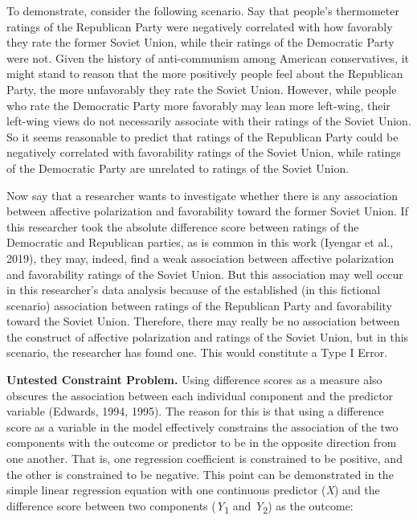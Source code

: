 \documentclass[authordate, meta, issue]{jote-new-article}
\begin{document}
	To demonstrate, consider the following scenario. Say that people's thermometer ratings of the Republican Party were negatively correlated with how favorably they rate the former Soviet Union, while their ratings of the Democratic Party were not. Given the history of anti-communism among American conservatives, it might stand to reason that the more positively people feel about the Republican Party, the more unfavorably they rate the Soviet Union. However, while people who rate the Democratic Party more favorably may lean more left-wing, their left-wing views do not necessarily associate with their ratings of the Soviet Union. So it seems reasonable to predict that ratings of the Republican Party could be negatively correlated with favorability ratings of the Soviet Union, while ratings of the Democratic Party are unrelated to ratings of the Soviet Union.



	Now say that a researcher wants to investigate whether there is any association between affective polarization and favorability toward the former Soviet Union. If this researcher took the absolute difference score between ratings of the Democratic and Republican parties, as is common in this work (Iyengar et al., 2019), they may, indeed, find a weak association between affective polarization and favorability ratings of the Soviet Union. But this association may well occur in this researcher's data analysis because of the established (in this fictional scenario) association between ratings of the Republican Party and favorability toward the Soviet Union. Therefore, there may really be no association between the construct of affective polarization and ratings of the Soviet Union, but in this scenario, the researcher has found one. This would constitute a Type I Error.



	\textbf{Untested Constraint Problem. }Using difference scores as a measure also obscures the association between each individual component and the predictor variable (Edwards, 1994, 1995). The reason for this is that using a difference score as a variable in the model effectively constrains the association of the two components with the outcome or predictor to be in the opposite direction from one another. That is, one regression coefficient is constrained to be positive, and the other is constrained to be negative. This point can be demonstrated in the simple linear regression equation with one continuous predictor (\emph{X}) and the difference score between two components (\emph{Y}\textsubscript{1} and \emph{Y}\textsubscript{2}) as the outcome:
\end{document}
